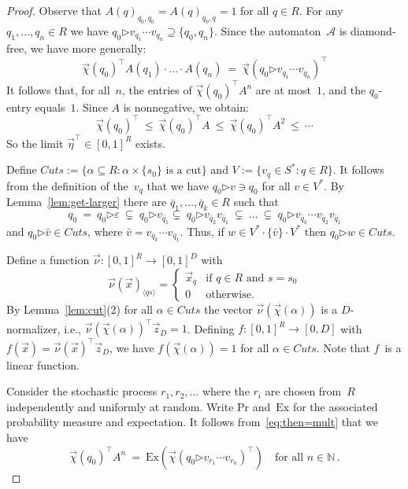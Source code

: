 \documentclass{elsarticle}
\def\<{\langle}
\def\>{\rangle}
\def\Nat{\mathbb{N}}
\def\cA{\mathcal{A}}
\def\Pr{\mathrm{Pr}}
\newcommand{\Ex}{\mathrm{Ex}}
\newcommand{\then}{\mathord{\triangleright}}
\begin{document}
\begin{proof}
Observe that $A(q)_{q_0,q_0} = A(q)_{q_0,q} = 1$ for all $q \in R$.
For any $q_1, \ldots, q_n \in R$ we have $q_0 \then v_{q_1} \cdots v_{q_n} \supseteq \{q_0,q_n\}$.
Since the automaton~$\cA$ is diamond-free, we have more generally:
\begin{equation} \label{eq:then=mult}
  \vec{\chi}(q_0)^\top A(q_1) \cdot \ldots \cdot A(q_n) \ = \ \vec{\chi}(q_0 \then v_{q_1} \cdots v_{q_n})^\top
\end{equation}
It follows that, for all~$n$, the entries of $\vec{\chi}(q_0)^\top A^n$ are at most~$1$, and the $q_0$-entry equals~$1$.
Since $A$ is nonnegative, we obtain:
\[
 \vec{\chi}(q_0)^\top \ \leqslant \ \vec{\chi}(q_0)^\top A \ \leqslant \ \vec{\chi}(q_0)^\top A^2 \ \leqslant \ \cdots
\]
So the limit $\vec{\eta}^\top \in [0,1]^R$ exists.

\newcommand{\Cuts}{\mathit{Cuts}}Define $\Cuts := \{\alpha \subseteq R : \alpha \times \{s_0\} \text{ is a cut}\}$ and $V := \{v_q \in S^* : q \in R\}$.
It follows from the definition of the~$v_q$ that we have $q_0 \then v \ni q_0$ for all $v \in V^*$.
By Lemma~\ref{lem:get-larger} there are $\bar q_1, \ldots, \bar q_k \in R$ such that
\[
q_0 \ = \ q_0 \then \varepsilon \ \subsetneq \ q_0 \then v_{\bar q_1} \subsetneq \ q_0 \then v_{\bar q_2} v_{\bar q_1} \ \subsetneq \ \ldots \ \subsetneq \ q_0 \then v_{\bar q_k} \cdots v_{\bar q_2} v_{\bar q_1}
\]
and $q_0 \then \bar v \in \Cuts$, where $\bar v = v_{\bar q_k} \cdots v_{\bar q_1}$.
Thus, if $w \in V^* \cdot \{ \bar v \} \cdot V^*$ then $q_0 \then w \in \Cuts$.

Define a function $\vec{\nu} : [0,1]^R \to [0,1]^D$ with
\[
\vec{\nu}(\vec{x})_{\<q s\>} =
\begin{cases}
    \vec{x}_{q} & \text{if } q \in R \text{ and } s = s_0 \\[0.5ex]
    0 & \text{otherwise.}
\end{cases}
\]
By Lemma~\ref{lem:cut}(2) for all $\alpha \in \Cuts$ the vector $\vec{\nu}(\vec{\chi}(\alpha))$ is a $D$-normalizer, i.e., $\vec{\nu}(\vec{\chi}(\alpha))^\top \vec{z}_D = 1$.
Defining $f : [0,1]^R \to [0,D]$ with $f(\vec{x}) = \vec{\nu}(\vec{x})^\top \vec{z}_D$, we have $f(\vec{\chi}(\alpha)) = 1$ for all $\alpha \in \Cuts$.
Note that $f$~is a linear function.

Consider the stochastic process $r_1, r_2, \ldots$ where the $r_i$ are chosen from~$R$ independently and uniformly at random.
Write $\Pr$ and~$\Ex$ for the associated probability measure and expectation.
It follows from~\eqref{eq:then=mult} that we have
\begin{equation} \label{eq:NC-Expectation}
 \vec{\chi}(q_0)^\top A^n \ = \ \Ex\left(\vec{\chi}(q_0 \then v_{r_1} \cdots v_{r_n})^\top\right) \quad \text{for all $n \in \Nat$}\,.
\end{equation}


\end{proof}
\end{document}
